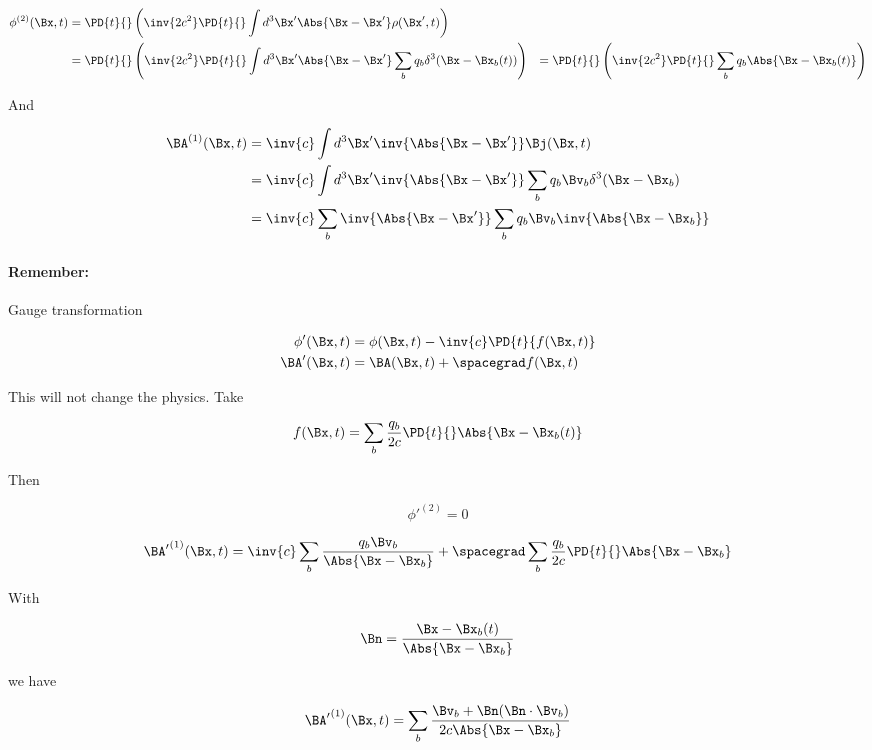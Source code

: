 \begin{align*}
\phi^{(2)}(\Bx, t) 
&= \PD{t}{} \left( \inv{2 c^2} \PD{t}{} \int d^3 \Bx' \Abs{\Bx - \Bx'} \rho(\Bx', t) \right) \\
&= \PD{t}{} \left( \inv{2 c^2} \PD{t}{} \int d^3 \Bx' \Abs{\Bx - \Bx'} \sum_b q_b \delta^3(\Bx - \Bx_b(t)) \right)
&= \PD{t}{} \left( \inv{2 c^2} \PD{t}{} \sum_b q_b \Abs{\Bx - \Bx_b(t)} \right)
\end{align*}

And 

\begin{align*}
\BA^{(1)}(\Bx, t) 
&= \inv{c} \int d^3 \Bx' \inv{\Abs{\Bx - \Bx'}} \Bj(\Bx, t) \\
&= \inv{c} \int d^3 \Bx' \inv{\Abs{\Bx - \Bx'}} \sum_b q_b \Bv_b \delta^3(\Bx -\Bx_b) \\
&= \inv{c} \sum_b \inv{\Abs{\Bx - \Bx'}} \sum_b q_b \Bv_b \inv{\Abs{\Bx -\Bx_b}} \\
\end{align*}

\paragraph{Remember:} Gauge transformation

\begin{align}\label{eqn:relativisticElectrodynamicsL25:n}
\phi'(\Bx, t) &= \phi(\Bx, t) - \inv{c} \PD{t}{f(\Bx, t)} \\
\BA'(\Bx, t) &= \BA(\Bx, t) + \spacegrad f(\Bx, t) \\
\end{align}

This will not change the physics.  Take

\begin{equation}\label{eqn:relativisticElectrodynamicsL25:n}
f(\Bx, t) = \sum_b \frac{q_b}{2 c} \PD{t}{} \Abs{\Bx - \Bx_b(t)}
\end{equation}

Then 

\begin{equation}\label{eqn:relativisticElectrodynamicsL25:n}
{\phi'}^{(2)} = 0
\end{equation}

\begin{equation}\label{eqn:relativisticElectrodynamicsL25:n}
{\BA'}^{(1)}(\Bx, t) = \inv{c} \sum_b \frac{q_b \Bv_b}{\Abs{\Bx - \Bx_b}} + \spacegrad \sum_b \frac{q_b}{2 c} \PD{t}{} \Abs{\Bx - \Bx_b}
\end{equation}

With 

\begin{equation}\label{eqn:relativisticElectrodynamicsL25:n}
\Bn = \frac{\Bx - \Bx_b(t)}{\Abs{\Bx - \Bx_b}}
\end{equation}

we have

\begin{equation}\label{eqn:relativisticElectrodynamicsL25:n}
{\BA'}^{(1)}(\Bx, t) = \sum_b \frac{\Bv_b + \Bn (\Bn \cdot \Bv_b)}{2 c \Abs{\Bx - \Bx_b} }
\end{equation}

\EndArticle
